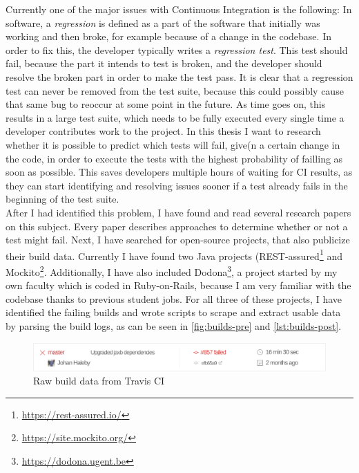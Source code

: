 \noindent Currently one of the major issues with Continuous Integration is the following: In software, a \emph{regression} is defined as a part of the software that initially was working and then broke, for example because of a change in the codebase. In order to fix this, the developer typically writes a \emph{regression test}. This test should fail, because the part it intends to test is broken, and the developer should resolve the broken part in order to make the test pass. It is clear that a regression test can never be removed from the test suite, because this could possibly cause that same bug to reoccur at some point in the future. As time goes on, this results in a large test suite, which needs to be fully executed every single time a developer contributes work to the project. In this thesis I want to research whether it is possible to predict which tests will fail, give(n a certain change in the code, in order to execute the tests with the highest probability of failling as soon as possible. This saves developers multiple hours of waiting for CI results, as they can start identifying and resolving issues sooner if a test already fails in the beginning of the test suite.\\

\noindent After I had identified this problem, I have found and read several research papers on this subject. Every paper describes approaches to determine whether or not a test might fail. Next, I have searched for open-source projects, that also publicize their build data. Currently I have found two Java projects (REST-assured\footnote{\url{https://rest-assured.io/}} and Mockito\footnote{\url{https://site.mockito.org/}}. Additionally, I have also included Dodona\footnote{\url{https://dodona.ugent.be}}, a project started by my own faculty which is coded in Ruby-on-Rails, because I am very familiar with the codebase thanks to previous student jobs. For all three of these projects, I have identified the failing builds and wrote scripts to scrape and extract usable data by parsing the build logs, as can be seen in \autoref{fig:builds-pre} and \autoref{lst:builds-post}.

\begin{figure}[htbp]
  \includegraphics[width=\textwidth]{assets/builds-pre.pdf}
  \caption{Raw build data from Travis CI}
  \label{fig:builds-pre}
\end{figure}

